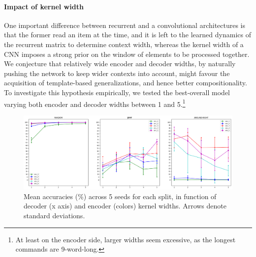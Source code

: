 \paragraph{Impact of kernel width}
\label{subsec:exp2}

One important difference between recurrent and a convolutional
architectures is that the former read an item at the time, and it is
left to the learned dynamics of the recurrent matrix to determine
context width, whereas the kernel width of a CNN imposes a strong
prior on the window of elements to be processed together. We
conjecture that relatively wide encoder and decoder widths, by
naturally pushing the network to keep wider contexts into account,
might favour the acquisition of template-based generalizations, and
hence better compositionality. To investigate this hypothesis
empirically, we tested the best-overall model varying both encoder and
decoder widths between 1 and 5.\footnote{At least on the encoder side,
  larger widths seem excessive, as the longest commands are
  9-word-long.}


\begin{figure}[tb]
    \centering
    \includegraphics[width=\textwidth,keepaspectratio]{figures/kernel_exp.png}
    \caption{Mean accuracies (\%) across 5 seeds for each split, in function of decoder (x axis) and encoder (colors) kernel widths. Arrows denote standard deviations.
    }
    \label{fig:kernel_exp}
\end{figure}

